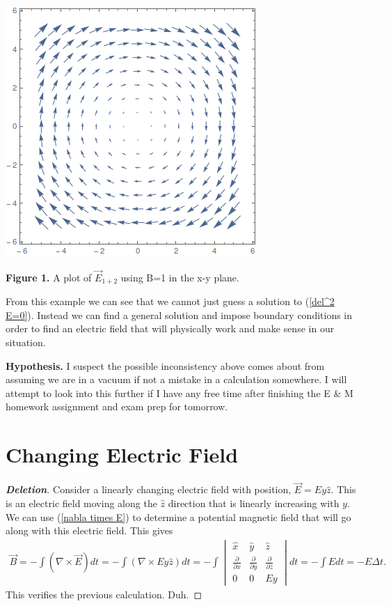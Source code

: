\documentclass[11pt]{article}
\newenvironment{Deletion}
{\let\oldqedsymbol=\qedsymbol
	\renewcommand{\qedsymbol}{$ $}
	\begin{proof}[\bfseries\upshape \color{red}Deletion]\color{red}}
	{\end{proof}
	\renewcommand{\qedsymbol}{\oldqedsymbol}}
\begin{document}
\begin{center}
	\includegraphics[]{E1plus2.png}
	
	{\footnotesize \textbf{Figure 1.} A plot of $\vec{E}_{1+2}$ using B=1 in the x-y plane.}
\end{center}

From this example we can see that we cannot just guess a solution to (\ref{del^2 E=0}). Instead we can find a general solution and impose boundary conditions in order to find an electric field that will physically work and make sense in our situation.

\begin{center}
	\textbf{Hypothesis.} I suspect the possible inconsistency above comes about from assuming we are in a vacuum if not a mistake in a calculation somewhere. I will attempt to look into this further if I have any free time after finishing the E \& M homework assignment and exam prep for tomorrow.
\end{center}


\section{Changing Electric Field}

\begin{Deletion}
Consider a linearly changing electric field with position, $\vec{E} = E y\hat{z}$. This is an electric field moving along the $\hat{z}$ direction that is linearly increasing with $y$. We can use (\ref{nabla times E}) to determine a potential magnetic field that will go along with this electric field. This gives 
\begin{align}
\vec{B} = -\int (\nabla \times \vec{E}) dt 
= -\int (\nabla \times Ey \hat{z}) dt 
= -\int \begin{vmatrix}
\hat{x} & \hat{y} & \hat{z} \\
\frac{\partial}{\partial x} & \frac{\partial}{\partial y} & \frac{\partial}{\partial z} \\
0 & 0 & Ey
\end{vmatrix} dt 
= -\int E dt =-E\Delta t.
\end{align}
This verifies the previous calculation. Duh.
\end{Deletion}
\end{document}
